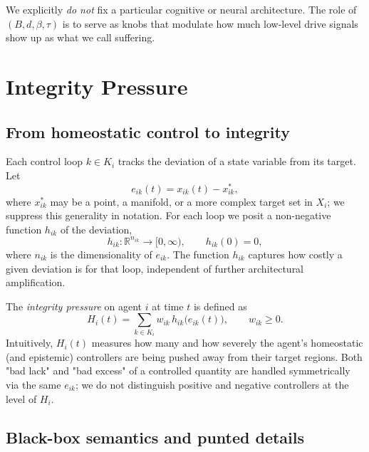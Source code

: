 \documentclass[11pt]{article}
\begin{document}
We explicitly \emph{do not} fix a particular cognitive or neural architecture. The role of $(B,d,\beta,\tau)$ is to serve as knobs that modulate how much low-level drive signals show up as what we call suffering.

\section{Integrity Pressure}

\subsection{From homeostatic control to integrity}

Each control loop $k \in K_i$ tracks the deviation of a state variable from its target. Let
\begin{equation}
  e_{ik}(t) = x_{ik}(t) - x^{\ast}_{ik},
\end{equation}
where $x^{\ast}_{ik}$ may be a point, a manifold, or a more complex target set in $X_i$; we suppress this generality in notation. For each loop we posit a non-negative function $h_{ik}$ of the deviation,
\begin{equation}
  h_{ik}: \mathbb R^{n_{ik}} \to [0,\infty), \qquad h_{ik}(0) = 0,
\end{equation}
where $n_{ik}$ is the dimensionality of $e_{ik}$. The function $h_{ik}$ captures how costly a given deviation is for that loop, independent of further architectural amplification.

The \emph{integrity pressure} on agent $i$ at time $t$ is defined as
\begin{equation}
  H_i(t) = \sum_{k \in K_i} w_{ik} \, h_{ik}\bigl(e_{ik}(t)\bigr), \qquad w_{ik} \ge 0. \label{eq:Hi-def}
\end{equation}
Intuitively, $H_i(t)$ measures how many and how severely the agent's homeostatic (and epistemic) controllers are being pushed away from their target regions. Both "bad lack" and "bad excess" of a controlled quantity are handled symmetrically via the same $e_{ik}$; we do not distinguish positive and negative controllers at the level of $H_i$.

\subsection{Black-box semantics and punted details}
\end{document}
